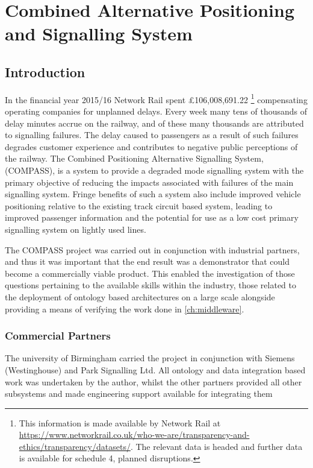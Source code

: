 \chapter{Combined Alternative Positioning and Signalling System}\label{ch:COMPASS}
\section{Introduction}
In the financial year 2015/16 Network Rail spent £106,008,691.22 \footnote{This information is made available by Network Rail at \url{https://www.networkrail.co.uk/who-we-are/transparency-and-ethics/transparency/datasets/}. The relevant data is headed  and further data is available for schedule 4, planned disruptions.} compensating operating companies for unplanned delays. Every week many tens of thousands of delay minutes accrue on the railway, and of these many thousands are attributed to signalling failures. The delay caused to passengers as a result of such failures degrades customer experience and contributes to negative public perceptions of the railway. The Combined Positioning Alternative Signalling System,(COMPASS), is a system to provide a degraded mode signalling system with the primary objective of reducing the impacts associated with failures of the main signalling system. Fringe benefits of such a system also include improved vehicle positioning relative to the existing track circuit based system, leading to improved passenger information and the potential for use as a low cost primary signalling system on lightly used lines. 

The COMPASS project was carried out in conjunction with industrial partners, and thus it was important that the end result was a demonstrator that could become a commercially viable product. This enabled the investigation of those questions pertaining to the available skills within the industry, those related to the deployment of ontology based architectures on a large scale alongside providing a means of verifying the work done in \autoref{ch:middleware}.

\subsection{Commercial Partners}
The university of Birmingham carried the project in conjunction with Siemens (Westinghouse) and Park Signalling Ltd. All ontology and data integration based work was undertaken by the author, whilst the other partners provided all other subsystems and made engineering support available for integrating them  

